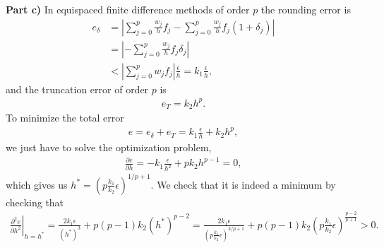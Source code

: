 \begin{solution}
\textbf{Part c)} In equispaced finite difference methods of order $p$ the rounding error is
\begin{align*}
e_{\delta}&=\left|\sum_{j=0}^{p}\frac{w_j}{h}f_j-\sum_{j=0}^{p}\frac{w_j}{h}f_j(1+\delta_j)\right|\\
&=\left|-\sum_{j=0}^{p}\frac{w_j}{h}f_j\delta_j\right|\\
&<\left|\sum_{j=0}^{p}w_jf_j\right|\frac{\epsilon}{h}=k_1\frac{\epsilon}{h},
\end{align*}
and the truncation error of order $p$ is 
\begin{align*}
e_T=k_2h^p.
\end{align*}
To minimize the total error
\begin{align*}
e=e_{\delta}+e_T=k_1\frac{\epsilon}{h}+k_2h^p,
\end{align*}
we just have to solve the optimization problem,
\begin{align*}
\frac{\partial e}{\partial h}=-k_1\frac{\epsilon}{h^2}+pk_2h^{p-1}=0,
\end{align*}
which gives us $h^*=\left(p\frac{k_1}{k_2}\epsilon\right)^{1/p+1}$. We check that it is indeed a minimum by checking that
\begin{align*}
\left.\frac{\partial^2e}{\partial h^2}\right|_{h=h^*}=\frac{2k_1\epsilon}{(h^*)^3}+p(p-1)k_2(h^*)^{p-2}=\frac{2k_1\epsilon}{\left(p\frac{k_1}{k_2}\epsilon\right)^{3/p+1}}+p(p-1)k_2\left(p\frac{k_1}{k_2}\epsilon\right)^{\frac{p-2}{p+1}}>0.
\end{align*}


\end{solution}
